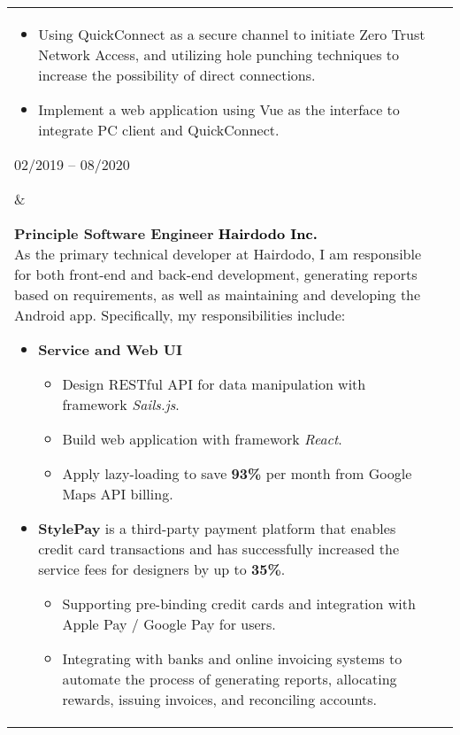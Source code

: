 \documentclass[10pt,A4]{article}
\makeatletter
\newcounter{a}
\newcounter{b}
\newcounter{c}
\newenvironment{entrylist}{%
	\begin{tabular*}{\textwidth}[t]{@{\extracolsep{\fill}}ll}
	}{%
	\end{tabular*}
}
\newcommand{\entry}[4]{%
	\parbox[t]{3.5cm}{%
		#1%
	}%
	&\parbox[t]{14cm}{%
		\textbf{#2}%
		\hfill%
		{\footnotesize \textbf{\textcolor{black}{#3}}}\\%
		#4%
	}\\\\}
\makeatother
\begin{document}
\begin{entrylist}
{\begin{itemize}[leftmargin=*]
					\begin{itemize}\normalsize
						\vspace{-1\baselineskip}
						\item Using QuickConnect as a secure channel to initiate Zero Trust Network Access, and utilizing hole punching techniques to increase the possibility of direct connections.
						\item Implement a web application using Vue as the interface to integrate PC client and QuickConnect.
					\end{itemize}
				\end{itemize}
					}
		\entry
		{02/2019 – 08/2020}
		{Principle Software Engineer}
		{Hairdodo Inc.}
		{As the primary technical developer at Hairdodo, I am responsible for both front-end and back-end development, generating reports based on requirements, as well as maintaining and developing the Android app. Specifically, my responsibilities include:\\
		\begin{itemize}[leftmargin=*]
			\vspace{-0.5\baselineskip}
			\item \textbf{Service and Web UI}
			\begin{itemize} \normalsize
				\item Design RESTful API for data manipulation with framework \textit{Sails.js}.
				\item Build web application with framework \textit{React}.
				\item Apply lazy-loading to save \textbf{93\%} per month from Google Maps API billing.
			\end{itemize}
			\item \textbf{StylePay} \small is a third-party payment platform that enables credit card transactions and has successfully increased the service fees for designers by up to \textbf{35\%}.
			\begin{itemize} \normalsize
				\item Supporting pre-binding credit cards and integration with Apple Pay / Google Pay for users.
				\item Integrating with banks and online invoicing systems to automate the process of generating reports, allocating rewards, issuing invoices, and reconciling accounts.
			\end{itemize}
		\end{itemize}
		}
		\entry
		{2015 – 06/2018}
		{Software Engineer}
		{Synology Inc.}
		{
			\begin{itemize}[leftmargin=*]
				\vspace{-0.5\baselineskip}
				\item Renovate live streaming mechanism By integrating FFmpeg / WebSocket / HTML5 and MSE(Media Source Extension)
			\end{itemize}}
	\end{entrylist}
\end{document}
